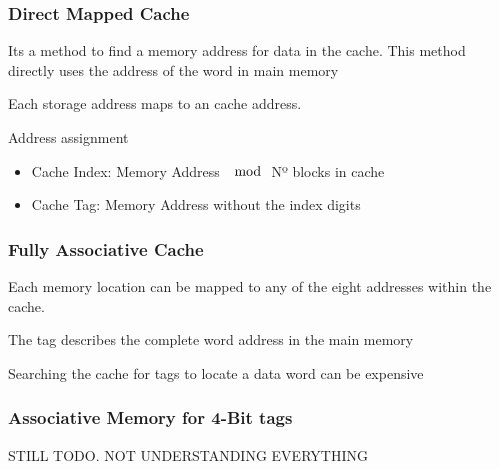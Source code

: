 \documentclass{article}
\begin{document}
\subsubsection{Direct Mapped Cache}
Its a method to find a memory address for data in the cache. This method directly uses the address of the word in main memory

Each storage address maps to an cache address.

Address assignment
\begin{itemize}
  \item Cache Index: Memory Address $\mod$ Nº blocks in cache
  \item Cache Tag: Memory Address without the index digits
\end{itemize}

\subsubsection{Fully Associative Cache}

Each memory location can be mapped to any of the eight addresses within the cache. 

The tag describes the complete word address in the main memory

Searching the cache for tags to locate a data word can be expensive


\subsubsection{Associative Memory for 4-Bit tags}



STILL TODO. NOT UNDERSTANDING EVERYTHING
\end{document}
